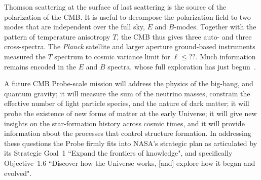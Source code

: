 Thomson scattering at the surface of last scattering is the source of the polarization of the \ac{CMB}. It is useful 
to decompose the polarization field to two modes that are independent over the full sky, $E$ and $B$-modes. 
Together with the pattern of temperature anisotropy $T$, the \ac{CMB} thus gives three auto- and three cross-spectra. 
The {\it Planck} satellite and larger aperture ground-based instruments measured the $T$ spectrum to cosmic
variance limit for $\ell \leq ??$. Much information remains encoded in the $E$ and $B$ spectra, whose full exploration 
has just begun~\cite{planck,spt,polarbear,bicep}.   

A future \ac{CMB} Probe-scale mission will address the physics of the big-bang, and quantum gravity; it will 
measure the sum of the neutrino masses, constrain the effective number of light particle species, and 
the nature of dark matter; it will probe the existence of new forms of matter at the early Universe; it will 
give new insights on the star-formation history across cosmic times, and it will provide information about 
the processes that control structure formation. In addressing these questions the Probe firmly fits into 
NASA's strategic plan as articulated by its Strategic Goal~1 ``Expand the frontiers of knowledge", and specifically 
Objective~1.6 ``Discover how the Universe works, [and] explore how it began and evolved".

